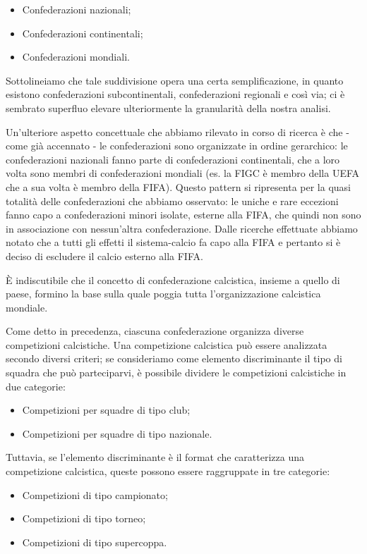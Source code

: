 \begin{itemize}
	\item Confederazioni nazionali;
	\item Confederazioni continentali;
	\item Confederazioni mondiali.
\end{itemize}

Sottolineiamo che tale suddivisione opera una certa semplificazione, in quanto
esistono confederazioni subcontinentali, confederazioni regionali e così via; ci è sembrato
superfluo elevare ulteriormente la granularità della nostra analisi.

Un'ulteriore aspetto concettuale che abbiamo rilevato in corso di ricerca è che -
come già accennato - le confederazioni sono organizzate in ordine gerarchico: le confederazioni
nazionali fanno parte di confederazioni continentali, che a loro volta sono
membri di confederazioni mondiali (es. la FIGC è membro della UEFA che a sua volta è membro
della FIFA).
Questo pattern si ripresenta per la quasi totalità delle confederazioni che abbiamo osservato:
le uniche e rare eccezioni fanno capo a confederazioni minori isolate, esterne alla FIFA,
che quindi non sono in associazione con nessun'altra confederazione.
Dalle ricerche effettuate abbiamo notato che a tutti gli effetti il sistema-calcio fa capo
alla FIFA e pertanto si è deciso di escludere il calcio esterno alla FIFA.


È indiscutibile che il concetto di confederazione calcistica, insieme a quello di paese,
formino la base sulla quale poggia tutta l'organizzazione calcistica mondiale.

\bigskip
\bigskip

Come detto in precedenza, ciascuna confederazione organizza diverse competizioni calcistiche.
Una competizione calcistica può essere analizzata secondo diversi criteri;
se consideriamo come elemento discriminante il tipo di squadra che può parteciparvi, è possibile
dividere le competizioni calcistiche in due categorie:
\begin{itemize}
	\item Competizioni per squadre di tipo club;
	\item Competizioni per squadre di tipo nazionale.
\end{itemize}

Tuttavia, se l'elemento discriminante è il format che caratterizza una competizione
calcistica, queste possono essere raggruppate in tre categorie:
\begin{itemize}
	\item Competizioni di tipo campionato;
	\item Competizioni di tipo torneo;
	\item Competizioni di tipo supercoppa.
\end{itemize}

